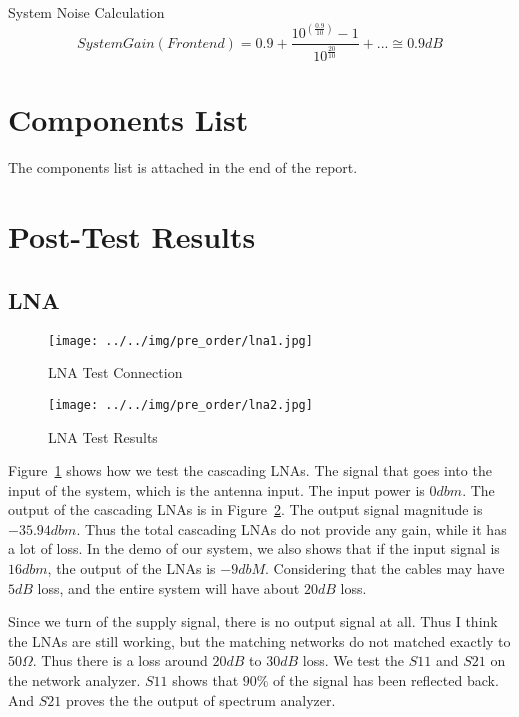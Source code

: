 \documentclass[]{article}
\begin{document}
    System Noise Calculation
    \begin{equation}
        System Gain (Front end) = 0.9 +
        \frac{10^(\frac{0.9}{10})-1}{10^\frac{20}{10}} + ... \cong 0.9dB
    \end{equation}

\section{Components List}
    The components list is attached in the end of the report.

\section{Post-Test Results}
\subsection{LNA}
    \begin{figure}[t!]
        \begin{center}
            \vspace{-0.3in}
            \texttt{[image: ../../img/pre\_order/lna1.jpg]}
            \caption{LNA Test Connection}
            \label{fig:lna1}
        \end{center}
    \end{figure}

    \begin{figure}[b!]
        \begin{center}
            \vspace{-0in}
            \texttt{[image: ../../img/pre\_order/lna2.jpg]}
            \caption{LNA Test Results}
            \label{fig:lna2}
        \end{center}
    \end{figure}

    Figure~\ref{fig:lna1} shows how we test the cascading LNAs. The signal that
    goes into the input of the system, which is the antenna input. The input
    power is $0dbm$. The output of the cascading LNAs is in Figure~\ref{fig:lna2}.
    The output signal magnitude is $-35.94dbm$. Thus the total cascading LNAs
    do not provide any gain, while it has a lot of loss. In the demo of our
    system, we also shows that if the input signal is $16dbm$, the output of
    the LNAs is $-9dbM$. Considering that the cables may have $5dB$ loss,
    and the entire system will have about $20dB$ loss.

    Since we turn of the supply signal, there is no output signal at all. Thus I
    think the LNAs are still working, but the matching networks do not matched
    exactly to $50\Omega$. Thus there is a loss around $20dB$ to $30dB$ loss.
    We test the $S11$ and $S21$ on the network analyzer. $S11$ shows that $90\%$
    of the signal has been reflected back. And $S21$ proves the the output of
    spectrum analyzer. 
\end{document}
